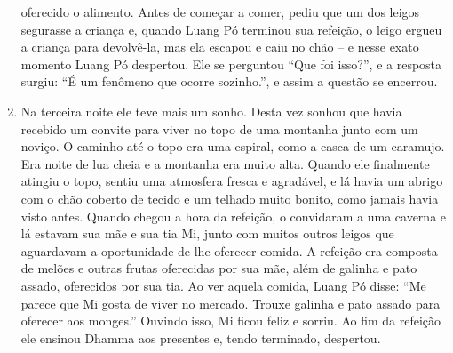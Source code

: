 \begin{enumerate}
  oferecido o alimento. Antes de começar a comer, pediu que um dos
  leigos segurasse a criança e, quando Luang Pó terminou sua refeição, o
  leigo ergueu a criança para devolvê-la, mas ela escapou e caiu no chão
  -- e nesse exato momento Luang Pó despertou. Ele se perguntou ``Que
  foi isso?'', e a resposta surgiu: ``É um fenômeno que ocorre
  sozinho.'', e assim a questão se encerrou.
\item
  Na terceira noite ele teve mais um sonho. Desta vez sonhou que havia
  recebido um convite para viver no topo de uma montanha junto com um
  noviço. O caminho até o topo era uma espiral, como a casca de um
  caramujo. Era noite de lua cheia e a montanha era muito alta. Quando
  ele finalmente atingiu o topo, sentiu uma atmosfera fresca e
  agradável, e lá havia um abrigo com o chão coberto de tecido e um
  telhado muito bonito, como jamais havia visto antes. Quando chegou a
  hora da refeição, o convidaram a uma caverna e lá estavam sua mãe e
  sua tia Mi, junto com muitos outros leigos que aguardavam a
  oportunidade de lhe oferecer comida. A refeição era composta de melões
  e outras frutas oferecidas por sua mãe, além de galinha e pato assado,
  oferecidos por sua tia. Ao ver aquela comida, Luang Pó disse: ``Me
  parece que Mi gosta de viver no mercado. Trouxe galinha e pato assado
  para oferecer aos monges.'' Ouvindo isso, Mi ficou feliz e sorriu. Ao
  fim da refeição ele ensinou Dhamma aos presentes e, tendo terminado,
  despertou.
\end{enumerate}

